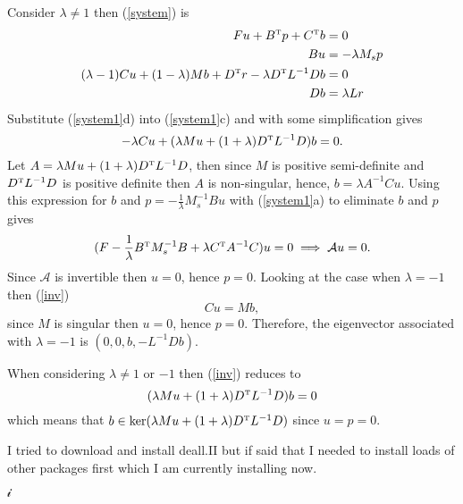 \documentclass[11pt]{article}
\newcommand{\Bt}{\ensuremath{B^{\mbox{\tiny{T}}}}}
\newcommand{\Ct}{\ensuremath{C^{\mbox{\tiny{T}}}}}
\newcommand{\Dt}{\ensuremath{D^{\mbox{\tiny{T}}}}}
\begin{document}
Consider $\lambda \neq 1$ then (\ref{system}) is
\begin{subequations} \label{system1}
    \begin{align}
        Fu+\Bt p+ \Ct b &= 0\\
        B u &= -\lambda M_s p\\
        (\lambda - 1)C u +(1-\lambda)Mb +\Dt r -\lambda \Dt L^{-1} D b &=0\\
        Db &= \lambda Lr
    \end{align}
\end{subequations}
Substitute (\ref{system1}d) into (\ref{system1}c) and with some simplification gives
\begin{equation} \label{inv}
-\lambda Cu+ (\lambda Mu +(1+\lambda)\Dt L^{-1}D)b=0.
\end{equation}
Let $A = \lambda Mu +(1+\lambda)\Dt L^{-1}D$, then since $M$ is positive semi-definite and $\Dt L^{-1}D$ is positive definite then $A$ is non-singular, hence, $b = \lambda A^{-1} Cu$. Using this expression for $b$ and $p = - \frac{1}{\lambda} M_s^{-1}Bu$ with (\ref{system1}a) to eliminate $b$ and $p$ gives
$$(F-\frac{1}{\lambda} \Bt M_s^{-1} B+\lambda \Ct A^{-1} C)u = 0 \implies \mathcal{A}u = 0.$$
Since $\mathcal{A}$ is invertible then $u=0$, hence $p=0$. Looking at the case when $\lambda = -1$ then (\ref{inv}) $$Cu = Mb,$$ since $M$ is singular then $u=0$, hence $p=0$. Therefore, the eigenvector associated with $\lambda = -1$ is $(0,0,b, -L^{-1}Db)$.

When considering $\lambda \neq 1$ or $-1$ then (\ref{inv}) reduces to
$$ (\lambda Mu +(1+\lambda)\Dt L^{-1}D)b=0$$
which means that $b\in \mbox{ker}(\lambda Mu +(1+\lambda)\Dt L^{-1}D)$ since $u=p=0$.

I tried to download and install deall.II but if said that I needed to install loads of other packages first which I am currently installing now.



$\mathscr{i}$
\end{document}
